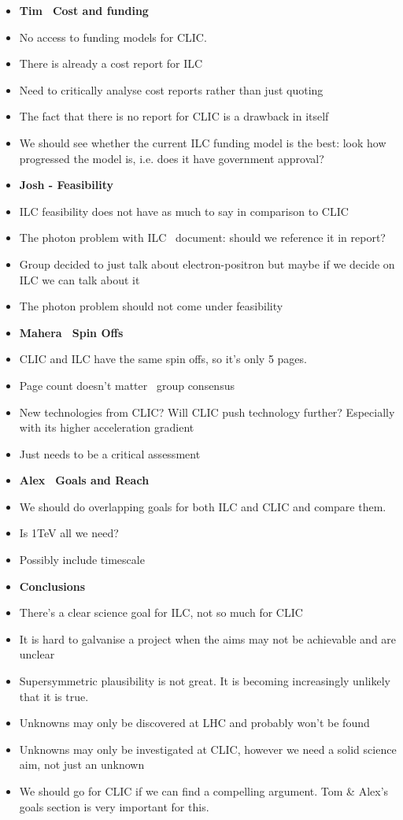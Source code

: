 \begin{itemize}
\item \textbf{Tim  \textemdash \, Cost and funding}
\item No access to funding models for CLIC.
\item There is already a cost report for ILC
\item Need to critically analyse cost reports rather than just quoting
\item The fact that there is no report for CLIC is a drawback in itself
\item We should see whether the current ILC funding model is the best: look how progressed the model is, i.e. does it have government approval?
\item \textbf{Josh - Feasibility}
\item ILC feasibility does not have as much to say in comparison to CLIC
\item The photon problem with ILC  \textemdash \, document: should we reference it in report?
\item Group decided to just talk about electron-positron but maybe if we decide on ILC we can talk about it
\item The photon problem should not come under feasibility
\item \textbf{Mahera  \textemdash \, Spin Offs}
\item CLIC and ILC have the same spin offs, so it’s only 5 pages.
\item Page count doesn’t matter  \textemdash \, group consensus
\item New technologies from CLIC? Will CLIC push technology further? Especially with its higher acceleration gradient
\item Just needs to be a critical assessment
\item \textbf{Alex  \textemdash \, Goals and Reach}
\item We should do overlapping goals for both ILC and CLIC and compare them.
\item Is 1TeV all we need?
\item Possibly include timescale
\item \textbf{Conclusions}
\item There’s a clear science goal for ILC, not so much for CLIC
\item It is hard to galvanise a project when the aims may not be achievable and are unclear
\item Supersymmetric plausibility is not great. It is becoming increasingly unlikely that it is true.
\item Unknowns may only be discovered at LHC and probably won’t be found
\item Unknowns may only be investigated at CLIC, however we need a solid science aim, not just an unknown
\item We should go for CLIC if we can find a compelling argument. Tom \& Alex’s goals section is very important for this.
\end{itemize}

